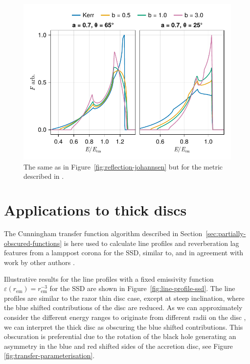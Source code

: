 \documentclass[fleqn,usenatbib]{mnras}
\newcommand{\rhoem}{r_\text{em}}
\begin{document}
\begin{figure}
    \centering
    \includegraphics[width=0.99\columnwidth]{figures/lineprofile.emda.pdf}
    \caption{The same as in Figure~\ref{fig:reflection-johannsen} but for the
    metric described in \citet{garcia_class_1995}.}
    \label{fig:reflection-emda}
\end{figure}

\section{Applications to thick discs}
\label{sec:applications}

The Cunningham transfer function algorithm described in
Section~\ref{sec:partially-obscured-functions} is here used to calculate line
profiles and reverberation lag features from a lamppost corona for the SSD,
similar to, and in agreement with work by other authors
\citep{taylor_exploring_2018,taylor_x-ray_2018}.

Illustrative results for the line profiles with a fixed emissivity function
$\varepsilon(\rhoem) = \rhoem^{-3}$ for the SSD are shown in
Figure~\ref{fig:line-profile-ssd}. The line profiles are similar to the razor
thin disc case, except at steep inclination, where the blue shifted
contributions of the disc are reduced. As we can approximately consider the
different energy ranges to originate from different radii on the disc
\cite{gates_on_2024}, we can interpret the thick disc as obscuring the blue
shifted contributions. This obscuration is preferential due to the rotation of
the black hole generating an asymmetry in the blue and red shifted sides of the
accretion disc, see Figure~
\ref{fig:transfer-parameterisation}.
\end{document}
